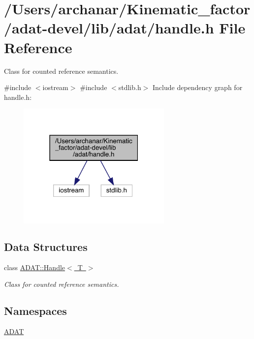 \hypertarget{adat-devel_2lib_2adat_2handle_8h}{}\section{/\+Users/archanar/\+Kinematic\+\_\+factor/adat-\/devel/lib/adat/handle.h File Reference}
\label{adat-devel_2lib_2adat_2handle_8h}


Class for counted reference semantics.  


{\ttfamily \#include $<$iostream$>$}\newline
{\ttfamily \#include $<$stdlib.\+h$>$}\newline
Include dependency graph for handle.\+h\+:
\nopagebreak
\begin{figure}[H]
\begin{center}
\leavevmode
\includegraphics[width=214pt]{d7/d81/adat-devel_2lib_2adat_2handle_8h__incl}
\end{center}
\end{figure}
\subsection*{Data Structures}
\begin{DoxyCompactItemize}
\item 
class \mbox{\hyperlink{classADAT_1_1Handle}{A\+D\+A\+T\+::\+Handle$<$ T $>$}}
\begin{DoxyCompactList}\small\item\em Class for counted reference semantics. \end{DoxyCompactList}\end{DoxyCompactItemize}
\subsection*{Namespaces}
\begin{DoxyCompactItemize}
\item 
 \mbox{\hyperlink{namespaceADAT}{A\+D\+AT}}
\end{DoxyCompactItemize}


